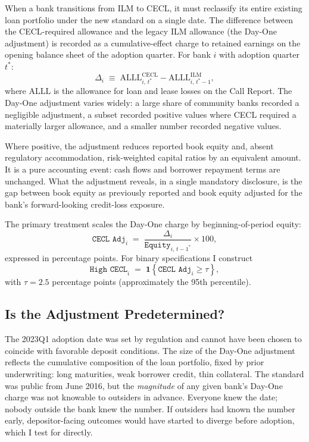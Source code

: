When a bank transitions from ILM to CECL, it must reclassify its entire
existing loan portfolio under the new standard on a single date.  The
difference between the CECL-required allowance and the legacy ILM allowance
(the Day-One adjustment) is recorded as a cumulative-effect charge to
retained earnings on the opening balance sheet of the adoption quarter.  For
bank $i$ with adoption quarter $t^{*}$:
\begin{equation}
  \Delta_i
  \;\equiv\;
  \mathrm{ALLL}^{\mathrm{CECL}}_{i,\,t^{*}}
  -
  \mathrm{ALLL}^{\mathrm{ILM}}_{i,\,t^{*}-1},
  \label{eq:dayone}
\end{equation}
where $\mathrm{ALLL}$ is the allowance for loan and lease losses on the Call
Report.  The Day-One adjustment varies widely: a large share of community
banks recorded a negligible adjustment, a subset recorded positive values
where CECL required a materially larger allowance, and a smaller number
recorded negative values.

Where positive, the adjustment reduces reported book equity and, absent
regulatory accommodation, risk-weighted capital ratios by an equivalent
amount.  It is a pure accounting event: cash flows and borrower repayment
terms are unchanged.  What the adjustment reveals, in a single mandatory
disclosure, is the gap between book equity as previously reported and book
equity adjusted for the bank's forward-looking credit-loss exposure.

The primary treatment scales the Day-One charge by beginning-of-period
equity:
\begin{equation}
  \texttt{CECL Adj}_{i}
  \;=\;
  \frac{\Delta_i}{\texttt{Equity}_{i,\,t-1^{*}}}
  \times 100,
  \label{eq:treatment}
\end{equation}
expressed in percentage points.  For binary specifications I construct
\begin{equation}
  \texttt{High CECL}_{i}
  \;=\;
  \mathbf{1}\!\left\{
    \texttt{CECL Adj}_{i} \geq \tau
  \right\},
  \label{eq:binary}
\end{equation}
with $\tau = 2.5$ percentage points (approximately the 95th percentile).

\subsection{Is the Adjustment Predetermined?}
\label{sec:background:predetermination}

The 2023Q1 adoption date was set by regulation and cannot have been
chosen to coincide with favorable deposit conditions.  The size of the
Day-One adjustment reflects the cumulative composition of the loan
portfolio, fixed by prior underwriting: long maturities, weak borrower
credit, thin collateral.  The standard was public from June 2016, but
the \emph{magnitude} of any given bank's Day-One charge was not
knowable to outsiders in advance.  Everyone knew the date; nobody
outside the bank knew the number.  If outsiders had known the number
early, depositor-facing outcomes would have started to diverge before
adoption, which I test for directly.

